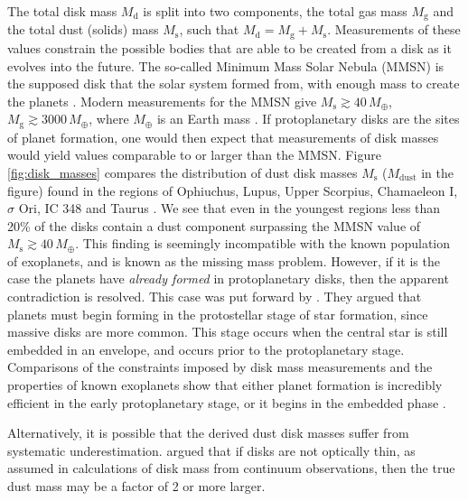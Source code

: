 The total disk mass $M_\mathrm{d}$ is split into two components, the total gas mass $M_\mathrm{g}$ and the total dust (solids) mass $M_\mathrm{s}$, such that $M_\mathrm{d} = M_\mathrm{g} + M_\mathrm{s}$. 
Measurements of these values constrain the possible bodies that are able to be created from a disk as it evolves into the future. 
The so-called Minimum Mass Solar Nebula (MMSN) is the supposed disk that the solar system formed from, with enough mass to create the planets \citep{weidenschilling1977b,hayashi1981}. 
Modern measurements for the MMSN give $M_\mathrm{s} \gtrsim 40 \, M_\oplus$, $M_\mathrm{g} \gtrsim 3000 \, M_\oplus$, where $M_\oplus$ is an Earth mass \citep[see review by][]{andrews2020}.
If protoplanetary disks are the sites of planet formation, one would then expect that measurements of disk masses would yield values comparable to or larger than the MMSN.
Figure \ref{fig:disk_masses} compares the distribution of dust disk masses $M_\mathrm{s}$ ($M_\mathrm{dust}$ in the figure) found in the regions of Ophiuchus, Lupus, Upper Scorpius, Chamaeleon I, $\sigma$ Ori, IC 348 and Taurus \citep[and references therin]{cieza2019}.
We see that even in the youngest regions less than 20\% of the disks contain a dust component surpassing the MMSN value of $M_\mathrm{s}\gtrsim 40 \, M_\oplus$.
This finding is seemingly incompatible with the known population of exoplanets, and is known as the missing mass problem.
However, if it is the case the planets have \textit{already formed} in protoplanetary disks, then the apparent contradiction is resolved.
This case was put forward by \citet{greaves2010}.
They argued that planets must begin forming in the protostellar stage of star formation, since massive disks are more common.
This stage occurs when the central star is still embedded in an envelope, and occurs prior to the protoplanetary stage.
Comparisons of the constraints imposed by disk mass measurements and the properties of known exoplanets show that either planet formation is incredibly efficient in the early protoplanetary stage, or it begins in the embedded phase \citep{najita2014,manara2018,Tychoniec2020}.

Alternatively, it is possible that the derived dust disk masses suffer from systematic underestimation. \citet{zhu2019} argued that if disks are not optically thin, as assumed in calculations of disk mass from continuum observations, then the true dust mass may be a factor of 2 or more larger.